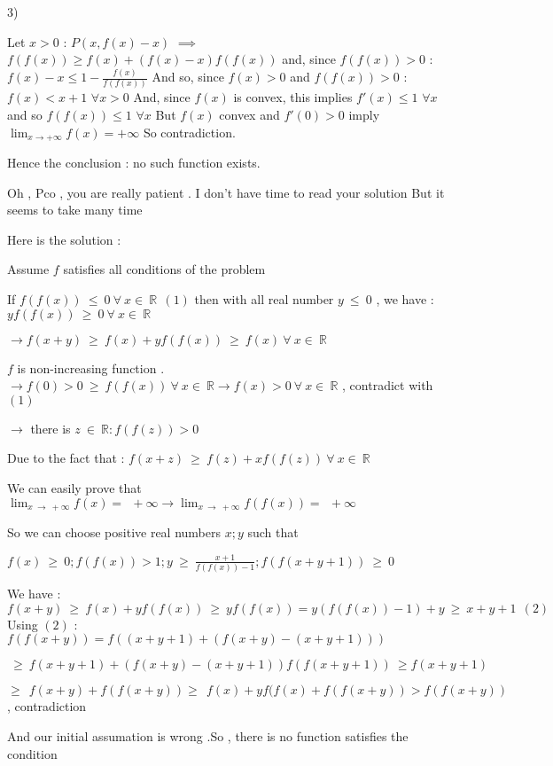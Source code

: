 \begin{solution}
3) 
Let $ x>0$ : $ P(x,f(x)-x)$ $ \implies$ $ f(f(x))\geq f(x)+(f(x)-x)f(f(x))$ and, since $ f(f(x))>0$ : $ f(x)-x\leq 1-\frac{f(x)}{f(f(x))}$
And so, since $ f(x)>0$ and $ f(f(x))>0$ : $ f(x)<x+1$ $ \forall x>0$
And, since $ f(x)$ is convex, this implies $ f'(x)\leq 1$ $ \forall x$ and so $ f(f(x))\leq 1$ $ \forall x$
But $ f(x)$ convex and $ f'(0)>0$ imply $ \lim_{x\to +\infty}f(x)=+\infty$
So contradiction.

Hence the conclusion : no such function exists.
\end{solution}



\begin{solution}
	\begin{italicized}Oh , Pco , you are really patient . I don't have time to read your solution But it seems to take many time  

   Here is the solution :

  Assume $ f$ satisfies all conditions of the problem

    If $ f(f(x)) \ \leq \ 0 \ \forall \ x \in \ \mathbb{R} \ \ (1)$ then with all real number $ y \ \leq \ 0$ , we have : $ yf(f(x))   \ \geq \ 0\ \forall \ x \in \ \mathbb{R}$

  $ \rightarrow f(x+y) \ \geq \ f(x) + yf(f(x))   \ \geq \ f(x)  \ \forall \ x \in \ \mathbb{R}$

  $ f$ is non-increasing function .
  $ \rightarrow f(0) > 0 \ \geq \  f(f(x)) \ \forall \ x \in \ \mathbb{R}  \rightarrow f(x) >0 \ \forall \ x \in \ \mathbb{R}$ , contradict with $ (1)$

    $ \rightarrow$ there is $ z \ \in \  \mathbb{R} : f(f(z)) >0$

  Due to the fact that : $ f(x+z) \ \geq \ f(z) + xf(f(z))   \ \forall \ x \in \ \mathbb{R}$

   We can easily prove that $ \lim_{x \ \to \ + \infty} f(x) = \ \ +  \infty  \rightarrow \lim_{x \ \to \ + \infty} f(f(x)) = \ \ + \infty$

  So we can choose positive real numbers $ x ; y$ such that 

$ f(x) \ \geq \ 0 ;  f(f(x)) > 1 ; y \ \geq \ \frac{x+1}{f(f(x)) -1 } ; f(f(x+y+1)) \ \geq \ 0$

 We have : $ f(x+y) \ \geq \ f(x) + yf(f(x))   \ \geq \   yf(f(x)) = y(f(f(x)) -1) + y \ \geq \ x+y+1 \ \ (2)$
   Using $ (2)$ :
  $ f(f(x+y)) = f(  (x+y+1) + (f(x+y) - ( x+y+1) ) )$

$ \ \geq \   f(x+y+1) +   (f(x+y) - ( x+y+1) ) f(f(x+y+1)) \ \geq f(x+y+1)$

$ \geq \ \ f(x+y) + f(f(x+y))  \geq \ \ f(x) + yf(f(x) + f(f(x+y)) > f(f(x+y))$ , contradiction

   And our initial assumation is wrong .So , there is no function satisfies the condition   \end{italicized}
\end{solution}
